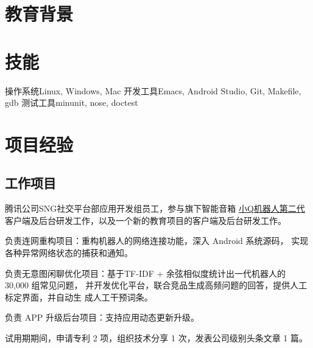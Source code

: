 
\section{\hei 教育背景}



\section{\hei 技能}

           {操作系统}{Linux, Windows, Mac}
           {开发工具}{Emacs, Android Studio, Git, Makefile, gdb}
           {测试工具}{minunit, nose, doctest}

\section{\hei 项目经验}


\subsection{\hei 工作项目}

{
  \begin{tightitemize}%
  \item 腾讯公司SNG社交平台部应用开发组员工，参与旗下智能音箱
    \href{https://qrobot.qq.com/}{小Q机器人第二代}客户端及后台研发工作，以及一个新的教育项目的客户端及后台研发工作。
  \item 负责连网重构项目：重构机器人的网络连接功能，深入 Android 系统源码，
    实现各种异常网络状态的捕获和通知。
  \item 负责无意图闲聊优化项目：基于TF-IDF $+$ 余弦相似度统计出一代机器人的 30,000 组常见问题，
    并开发优化平台，联合竞品生成高频问题的回答，提供人工标定界面，并自动生
    成人工干预词条。
  \item 负责 APP 升级后台项目：支持应用动态更新升级。
  \item 试用期期间，申请专利 2 项，组织技术分享 1 次，发表公司级别头条文章 1 篇。
  \end{tightitemize}}

